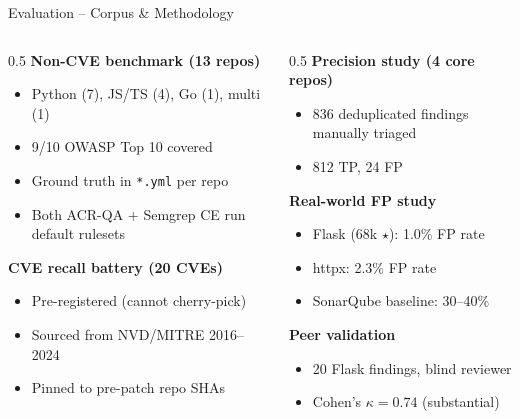 \documentclass[aspectratio=169,12pt]{beamer}
\begin{document}
\begin{frame}{Evaluation -- Corpus \& Methodology}
  \begin{columns}[T]
    \begin{column}{0.5\textwidth}
      \textbf{Non-CVE benchmark (13 repos)}
      \begin{itemize}\small
        \item Python (7), JS/TS (4), Go (1), multi (1)
        \item 9/10 OWASP Top 10 covered
        \item Ground truth in \texttt{*.yml} per repo
        \item Both ACR-QA + Semgrep CE run default rulesets
      \end{itemize}
      \vspace{4pt}
      \textbf{CVE recall battery (20 CVEs)}
      \begin{itemize}\small
        \item Pre-registered (cannot cherry-pick)
        \item Sourced from NVD/MITRE 2016--2024
        \item Pinned to pre-patch repo SHAs
      \end{itemize}
    \end{column}
    \begin{column}{0.5\textwidth}
      \textbf{Precision study (4 core repos)}
      \begin{itemize}\small
        \item 836 deduplicated findings manually triaged
        \item 812 TP, 24 FP
      \end{itemize}
      \vspace{4pt}
      \textbf{Real-world FP study}
      \begin{itemize}\small
        \item Flask (68k \(\star\)): 1.0\% FP rate
        \item httpx: 2.3\% FP rate
        \item SonarQube baseline: 30--40\%
      \end{itemize}
      \vspace{4pt}
      \textbf{Peer validation}
      \begin{itemize}\small
        \item 20 Flask findings, blind reviewer
        \item Cohen's $\kappa = 0.74$ (substantial)
      \end{itemize}
    \end{column}
  \end{columns}
\end{frame}
\end{document}
